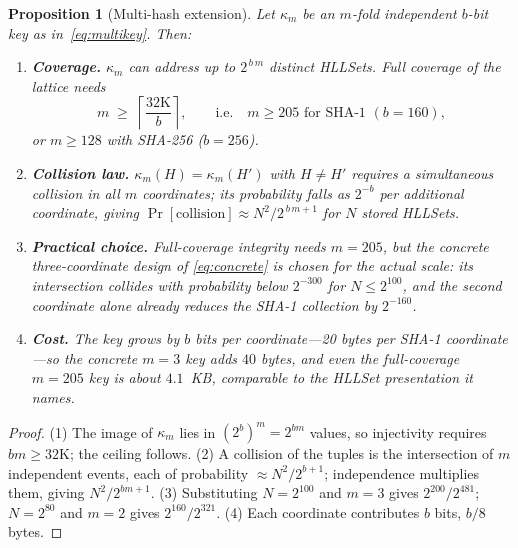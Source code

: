 \documentclass[11pt,a4paper]{article}
\newtheorem{proposition}[theorem]{Proposition}
\theoremstyle{remark}
\begin{document}
\begin{proposition}[Multi-hash extension]
\label{prop:multihash}
Let $\kappa_m$ be an $m$-fold independent $b$-bit key as in~\eqref{eq:multikey}.
Then:
\begin{enumerate}[leftmargin=*,nosep]
  \item \textbf{Coverage.} $\kappa_m$ can address up to $2^{\,b\,m}$ distinct
    HLLSets. Full coverage of the lattice needs
    \begin{equation}
      m \;\ge\; \left\lceil \frac{32\mathrm{K}}{b} \right\rceil,
      \qquad\text{i.e.}\quad m \ge 205 \text{ for SHA-1 }(b=160),
    \end{equation}
    or $m\ge 128$ with SHA-256 ($b=256$).
  \item \textbf{Collision law.} $\kappa_m(H)=\kappa_m(H')$ with $H\neq H'$
    requires a simultaneous collision in all $m$ coordinates; its probability
    falls as $2^{-b}$ per additional coordinate, giving
    $\Pr[\text{collision}]\approx N^2/2^{\,b\,m+1}$ for $N$ stored HLLSets.
  \item \textbf{Practical choice.} Full-coverage integrity needs $m=205$, but
    the concrete three-coordinate design of \eqref{eq:concrete} is chosen for
    the actual scale: its intersection collides with probability below
    $2^{-300}$ for $N\le 2^{100}$, and the second coordinate alone already
    reduces the SHA-1 collection by $2^{-160}$.
  \item \textbf{Cost.} The key grows by $b$ bits per coordinate---20 bytes per
    SHA-1 coordinate---so the concrete $m=3$ key adds $40$ bytes, and even the
    full-coverage $m=205$ key is about $4.1$~KB, comparable to the HLLSet
    presentation it names.
\end{enumerate}
\end{proposition}

\begin{proof}
(1) The image of $\kappa_m$ lies in $(2^b)^m = 2^{bm}$ values, so injectivity
requires $bm\ge 32\mathrm{K}$; the ceiling follows. (2) A collision of the
tuples is the intersection of $m$ independent events, each of probability
$\approx N^2/2^{b+1}$; independence multiplies them, giving
$N^2/2^{bm+1}$. (3) Substituting $N=2^{100}$ and $m=3$ gives $2^{200}/2^{481}$;
$N=2^{80}$ and $m=2$ gives $2^{160}/2^{321}$. (4) Each coordinate contributes
$b$ bits, $b/8$ bytes.
\end{proof}
\end{document}
